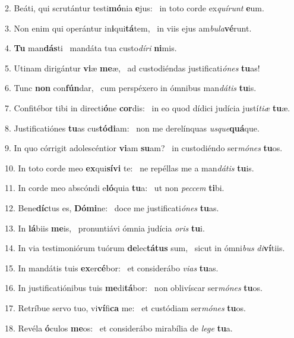 2. Beáti, qui scrutántur testi\textbf{mó}nia \textbf{e}jus: \ast\  in toto corde ex\textit{quí}\textit{runt} \textbf{e}um.\

3. Non enim qui operántur in\textbf{i}qui\textbf{tá}tem, \ast\  in viis ejus am\textit{bu}\textit{la}\textbf{vé}runt.\

4. \textbf{Tu} man\textbf{dás}ti \ast\  mandáta tua custo\textit{dí}\textit{ri} \textbf{ni}mis.\

5. Utinam dirigántur \textbf{vi}æ \textbf{me}æ, \ast\  ad custodiéndas justificati\textit{ó}\textit{nes} \textbf{tu}as!\

6. Tunc \textbf{non} con\textbf{fún}dar, \ast\  cum perspéxero in ómnibus man\textit{dá}\textit{tis} \textbf{tu}is.\

7. Confitébor tibi in directi\textbf{ó}ne \textbf{cor}dis: \ast\  in eo quod dídici judícia justí\textit{ti}\textit{æ} \textbf{tu}æ.\

8. Justificatiónes \textbf{tu}as cus\textbf{tó}\textbf{di}am: \ast\  non me derelínquas \textit{us}\textit{que}\textbf{quá}que.\

9. In quo córrigit adolescéntior \textbf{vi}am \textbf{su}am? \ast\  in custodiéndo ser\textit{mó}\textit{nes} \textbf{tu}os.\

10. In toto corde meo \textbf{ex}qui\textbf{sí}\textbf{vi} te: \ast\  ne repéllas me a man\textit{dá}\textit{tis} \textbf{tu}is.\

11. In corde meo abscóndi e\textbf{ló}quia \textbf{tu}a: \ast\  ut non \textit{pec}\textit{cem} \textbf{ti}bi.\

12. Bene\textbf{díc}tus es, \textbf{Dó}\textbf{mi}ne: \ast\  doce me justificati\textit{ó}\textit{nes} \textbf{tu}as.\

13. In \textbf{lá}biis \textbf{me}is, \ast\  pronuntiávi ómnia judícia \textit{o}\textit{ris} \textbf{tu}i.\

14. In via testimoniórum tuórum \textbf{de}lec\textbf{tá}\textbf{tus} sum, \ast\  sicut in ómni\textit{bus} \textit{di}\textbf{ví}tiis.\

15. In mandátis tuis \textbf{ex}er\textbf{cé}bor: \ast\  et considerábo \textit{vi}\textit{as} \textbf{tu}as.\

16. In justificatiónibus tuis \textbf{me}di\textbf{tá}bor: \ast\  non oblivíscar ser\textit{mó}\textit{nes} \textbf{tu}os.\

17. Retríbue servo tuo, vi\textbf{ví}fi\textbf{ca} me: \ast\  et custódiam ser\textit{mó}\textit{nes} \textbf{tu}os.\

18. Revéla \textbf{ó}culos \textbf{me}os: \ast\  et considerábo mirabília de \textit{le}\textit{ge} \textbf{tu}a.\

